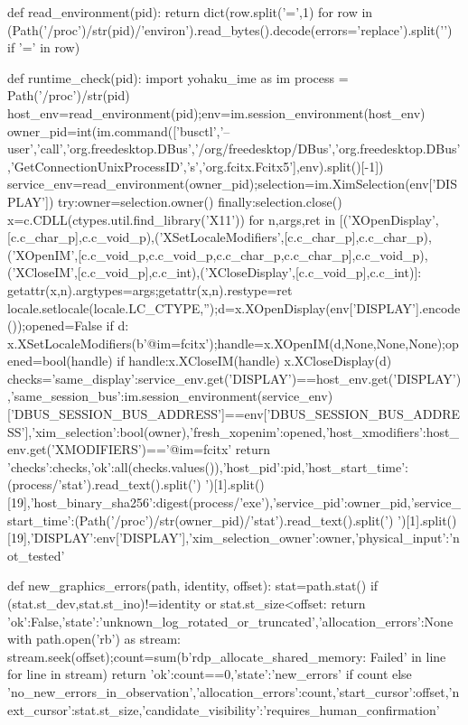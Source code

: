 def read_environment(pid):
    return dict(row.split('=',1) for row in (Path('/proc')/str(pid)/'environ').read_bytes().decode(errors='replace').split('\0') if '=' in row)

def runtime_check(pid):
    import yohaku_ime as im
    process = Path('/proc')/str(pid)
    host_env=read_environment(pid);env=im.session_environment(host_env)
    owner_pid=int(im.command(['busctl','--user','call','org.freedesktop.DBus','/org/freedesktop/DBus','org.freedesktop.DBus','GetConnectionUnixProcessID','s','org.fcitx.Fcitx5'],env).split()[-1])
    service_env=read_environment(owner_pid);selection=im.XimSelection(env['DISPLAY'])
    try:owner=selection.owner()
    finally:selection.close()
    x=c.CDLL(ctypes.util.find_library('X11'))
    for n,args,ret in [('XOpenDisplay',[c.c_char_p],c.c_void_p),('XSetLocaleModifiers',[c.c_char_p],c.c_char_p),('XOpenIM',[c.c_void_p,c.c_void_p,c.c_char_p,c.c_char_p],c.c_void_p),('XCloseIM',[c.c_void_p],c.c_int),('XCloseDisplay',[c.c_void_p],c.c_int)]:
        getattr(x,n).argtypes=args;getattr(x,n).restype=ret
    locale.setlocale(locale.LC_CTYPE,'');d=x.XOpenDisplay(env['DISPLAY'].encode());opened=False
    if d:
        x.XSetLocaleModifiers(b'@im=fcitx');handle=x.XOpenIM(d,None,None,None);opened=bool(handle)
        if handle:x.XCloseIM(handle)
        x.XCloseDisplay(d)
    checks={'same_display':service_env.get('DISPLAY')==host_env.get('DISPLAY'),'same_session_bus':im.session_environment(service_env)['DBUS_SESSION_BUS_ADDRESS']==env['DBUS_SESSION_BUS_ADDRESS'],'xim_selection':bool(owner),'fresh_xopenim':opened,'host_xmodifiers':host_env.get('XMODIFIERS')=='@im=fcitx'}
    return {'checks':checks,'ok':all(checks.values()),'host_pid':pid,'host_start_time':(process/'stat').read_text().split(') ')[1].split()[19],'host_binary_sha256':digest(process/'exe'),'service_pid':owner_pid,'service_start_time':(Path('/proc')/str(owner_pid)/'stat').read_text().split(') ')[1].split()[19],'DISPLAY':env['DISPLAY'],'xim_selection_owner':owner,'physical_input':'not_tested'}

def new_graphics_errors(path, identity, offset):
    stat=path.stat()
    if (stat.st_dev,stat.st_ino)!=identity or stat.st_size<offset:
        return {'ok':False,'state':'unknown_log_rotated_or_truncated','allocation_errors':None}
    with path.open('rb') as stream:
        stream.seek(offset);count=sum(b'rdp_allocate_shared_memory: Failed' in line for line in stream)
    return {'ok':count==0,'state':'new_errors' if count else 'no_new_errors_in_observation','allocation_errors':count,'start_cursor':offset,'next_cursor':stat.st_size,'candidate_visibility':'requires_human_confirmation'}

